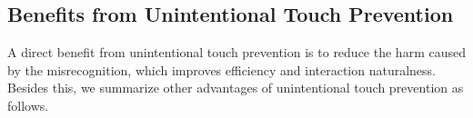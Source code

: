 


\subsection{Benefits from Unintentional Touch Prevention}

A direct benefit from unintentional touch prevention is to reduce the harm caused by the misrecognition, which improves efficiency and interaction naturalness. Besides this, we summarize other advantages of unintentional touch prevention as follows.

